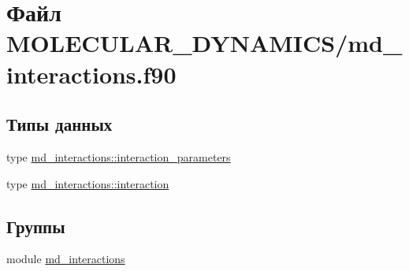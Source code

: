 \hypertarget{md__interactions_8f90}{}\section{Файл M\+O\+L\+E\+C\+U\+L\+A\+R\+\_\+\+D\+Y\+N\+A\+M\+I\+C\+S/md\+\_\+interactions.f90}
\label{md__interactions_8f90}
\subsection*{Типы данных}
\begin{DoxyCompactItemize}
\item 
type \mbox{\hyperlink{structmd__interactions_1_1interaction__parameters}{md\+\_\+interactions\+::interaction\+\_\+parameters}}
\item 
type \mbox{\hyperlink{structmd__interactions_1_1interaction}{md\+\_\+interactions\+::interaction}}
\end{DoxyCompactItemize}
\subsection*{Группы}
\begin{DoxyCompactItemize}
\item 
module \mbox{\hyperlink{namespacemd__interactions}{md\+\_\+interactions}}
\end{DoxyCompactItemize}
